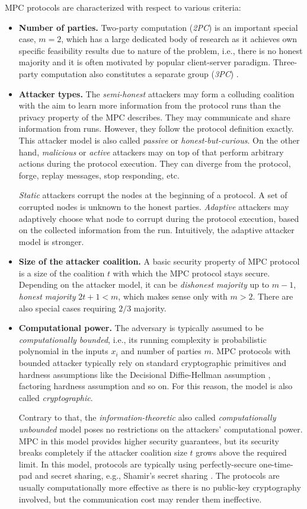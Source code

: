 \documentclass[
  digital, %
  twoside, %
  table,   %
  lof,     %
  lot,     %
]{fithesis3}
\newcommand{\itembf}[1]{\item {\bf{#1}}}
\newcounter{ph4_show_guides}
\theoremstyle{definition}
\theoremstyle{remark}
\begin{document}
MPC protocols are characterized with respect to various criteria:
\begin{itemize}
    \itembf{Number of parties.} Two-party computation (\emph{2PC}) is an important special case, $m=2$, which has a large dedicated body of research as it achieves own specific feasibility results due to nature of the problem, i.e., there is no honest majority and it is often motivated by popular client-server paradigm. Three-party computation also constitutes a separate group (\emph{3PC}) \cite{CKMZ14, MRZ15}.

    \itembf{Attacker types.} The \emph{semi-honest} attackers may form a colluding coalition with the aim to learn more information from the protocol runs than the privacy property of the MPC describes. They may communicate and share information from runs. However, they follow the protocol definition exactly. This attacker model is also called \emph{passive} or \emph{honest-but-curious}. 
    On the other hand, \emph{malicious} or \emph{active} attackers may on top of that perform arbitrary actions during the protocol execution. They can diverge from the protocol, forge, replay messages, stop responding, etc.

    \emph{Static} attackers corrupt the nodes at the beginning of a protocol. A set of corrupted nodes is unknown to the honest parties. \emph{Adaptive} attackers may adaptively choose what node to corrupt during the protocol execution, based on the collected information from the run. Intuitively, the adaptive attacker model is stronger.
    
    \itembf{Size of the attacker coalition.} A basic security property of MPC protocol is a size of the coalition $t$ with which the MPC protocol stays secure. Depending on the attacker model, it can be \emph{dishonest majority} up to $m-1$, \emph{honest majority} $2t+1 < m$, which makes sense only with $m>2$. There are also special cases requiring $2/3$ majority.

    \itembf{Computational power.} The adversary is typically assumed to be \emph{computationally bounded}, i.e., its running complexity is probabilistic polynomial in the inputs $x_i$ and number of parties $m$.
    MPC protocols with bounded attacker typically rely on standard cryptographic primitives and hardness assumptions like the Decisional Diffie-Hellman assumption \cite{KL07}, factoring hardness assumption and so on. For this reason, the model is also called \emph{cryptographic}.
    
    Contrary to that, the \emph{information-theoretic} also called \emph{computationally unbounded} model poses no restrictions on the attackers' computational power. MPC in this model provides higher security guarantees, but its security breaks completely if the attacker coalition size $t$ grows above the required limit. 
    In this model, protocols are typically using perfectly-secure one-time-pad and secret sharing, e.g., Shamir's secret sharing \cite{Shamir79}. The protocols are usually computationally more effective as there is no public-key cryptography involved, but the communication cost may render them ineffective. 
    

\end{itemize}
\end{document}
